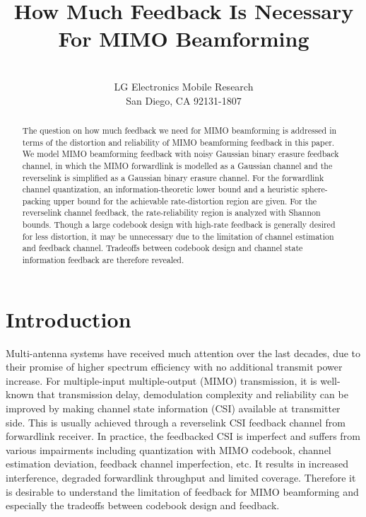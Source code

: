 \documentclass[10pt,fleqn, twocolumn]{IEEEtran}
\title{How Much Feedback Is Necessary For MIMO Beamforming}
\author{\\LG Electronics Mobile Research\\San Diego, CA 92131-1807}
\date{}
\begin{document}
\maketitle
\begin{abstract}\small
The question on how much feedback we need for MIMO beamforming is
addressed in terms of the distortion and reliability of MIMO
beamforming feedback in this paper. We model MIMO beamforming
feedback with noisy Gaussian binary erasure feedback channel, in
which the MIMO forwardlink is modelled as a Gaussian channel and
the reverselink is simplified as a Gaussian binary erasure
channel. For the forwardlink channel quantization, an
information-theoretic lower bound and a heuristic sphere-packing
upper bound for the achievable rate-distortion region are given.
For the reverselink channel feedback, the rate-reliability region
is analyzed with Shannon bounds. Though a large codebook design
with high-rate feedback is generally desired for less distortion,
it may be unnecessary due to the limitation of channel estimation
and feedback channel. Tradeoffs between codebook design and
channel state information feedback are therefore revealed.
\end{abstract}

\section{Introduction}
Multi-antenna systems have received much attention over the last
decades, due to their promise of higher spectrum efficiency with
no additional transmit power increase. For multiple-input
multiple-output (MIMO) transmission, it is well-known that
transmission delay, demodulation complexity and reliability can be
improved by making channel state information (CSI) available at
transmitter side. This is usually achieved through a reverselink
CSI feedback channel from forwardlink receiver. In practice, the
feedbacked CSI is imperfect and suffers from various impairments
including quantization with MIMO codebook, channel estimation
deviation, feedback channel imperfection, etc. It results in
increased interference, degraded forwardlink throughput and
limited coverage. Therefore it is desirable to understand the
limitation of feedback for MIMO beamforming and especially the
tradeoffs between codebook design and feedback.
\end{document}

